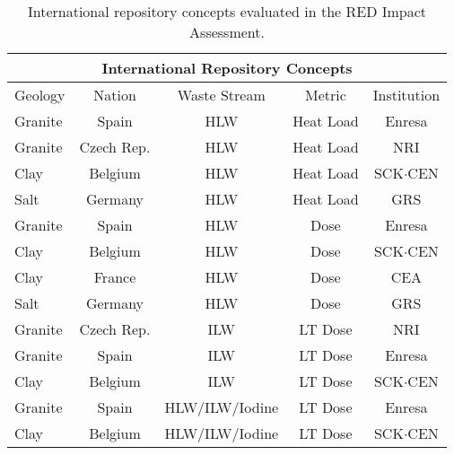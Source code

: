 
\begin{table}
  \centering
  \footnotesize{
  \begin{tabular}{|l|c|c|c|c|}
    \multicolumn{5}{c}{\textbf{International Repository Concepts}}\\
    \hline
    Geology     & Nation      & Waste Stream   & Metric    & Institution \\
    \hline 
    Granite     & Spain       & HLW            & Heat Load & Enresa  \\
    Granite     & Czech Rep.  & HLW            & Heat Load & NRI \\
    Clay        & Belgium     & HLW            & Heat Load & SCK$\cdot$CEN \\
    Salt        & Germany     & HLW            & Heat Load & GRS \\
    Granite     & Spain       & HLW            & Dose      & Enresa  \\
    Clay        & Belgium     & HLW            & Dose      & SCK$\cdot$CEN \\
    Clay        & France      & HLW            & Dose      & CEA \\
    Salt        & Germany     & HLW            & Dose      & GRS  \\
    Granite     & Czech Rep.  & ILW            & LT Dose   & NRI  \\
    Granite     & Spain       & ILW            & LT Dose   & Enresa  \\
    Clay        & Belgium     & ILW            & LT Dose   & SCK$\cdot$CEN  \\
    Granite     & Spain       & HLW/ILW/Iodine & LT Dose   & Enresa \\
    Clay        & Belgium     & HLW/ILW/Iodine & LT Dose   & SCK$\cdot$CEN \\
    \hline
  \end{tabular}
  \caption[International Repository Concepts]{International repository concepts evaluated in the RED Impact 
  Assessment.\cite{von_lensa_red-impact_2008}}
  \label{tab:red}
  }
\end{table}



